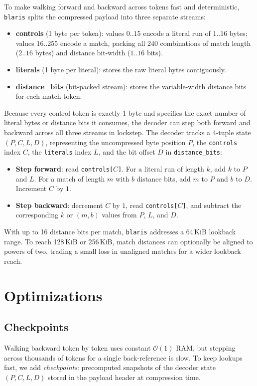\documentclass[10pt,twocolumn]{article}
\newcommand{\code}[1]{\texttt{#1}}
\begin{document}
To make walking forward and backward across tokens fast and deterministic,
\code{blaris} splits the compressed payload into three separate streams:
\begin{itemize}
    \item \textbf{controls} (1 byte per token): values $0..15$ encode a literal
        run of $1..16$ bytes; values $16..255$ encode a match, packing all 240
        combinations of match length ($2..16$ bytes) and distance bit-width
        ($1..16$ bits).
    \item \textbf{literals} (1 byte per literal): stores the raw literal bytes
        contiguously.
    \item \textbf{distance\_bits} (bit-packed stream): stores the variable-width
        distance bits for each match token.
\end{itemize}

Because every control token is exactly 1 byte and specifies the exact number of
literal bytes or distance bits it consumes, the decoder can step both forward
and backward across all three streams in lockstep. The decoder tracks a 4-tuple
state $(P, C, L, D)$, representing the uncompressed byte position $P$, the
\code{controls} index $C$, the \code{literals} index $L$, and the bit offset $D$
in \code{distance\_bits}:
\begin{itemize}
    \item \textbf{Step forward}: read \code{controls[$C$]}. For a literal run of
        length $k$, add $k$ to $P$ and $L$. For a match of length $m$ with $b$
        distance bits, add $m$ to $P$ and $b$ to $D$. Increment $C$ by $1$.
    \item \textbf{Step backward}: decrement $C$ by $1$, read
        \code{controls[$C$]}, and subtract the corresponding $k$ or $(m, b)$
        values from $P$, $L$, and $D$.
\end{itemize}

With up to 16 distance bits per match, \code{blaris} addresses a 64\,KiB
lookback range. To reach 128\,KiB or 256\,KiB, match distances can optionally be
aligned to powers of two, trading a small loss in unaligned matches for a wider
lookback reach.

\section{Optimizations}

\subsection{Checkpoints}
Walking backward token by token uses constant $\mathcal{O}(1)$ RAM, but stepping
across thousands of tokens for a single back-reference is slow.
To keep lookups fast, we add \emph{checkpoints}: precomputed
snapshots of the decoder state $(P, C, L, D)$ stored in the payload header at
compression time.
\end{document}
